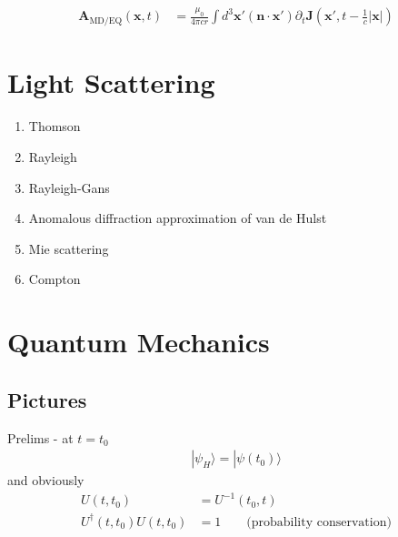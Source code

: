 \documentclass[../main.tex]{subfiles}
\begin{document}
\begin{align}
\mathbf{A}_\text{MD/EQ}(\mathbf{x},t)
&=\frac{\mu_0}{4\pi cr}\int d^3\mathbf{x}'(\mathbf{n}\cdot\mathbf{x}')\partial_t\mathbf{J}(\mathbf{x}',t-\frac{1}{c}|\mathbf{x}|)
\end{align}

\section{Light Scattering}

\begin{enumerate}
\item Thomson
\item Rayleigh 
\item Rayleigh-Gans
\item Anomalous diffraction approximation of van de Hulst
\item Mie scattering
\item Compton
\end{enumerate}

\section{Quantum Mechanics}
\subsection{Pictures}
Prelims - at $t=t_0$
\begin{align}
|\psi_H\rangle=|\psi(t_0)\rangle
\end{align}
and obviously
\begin{align}
U(t,t_0)&=U^{-1}(t_0,t)\\
U^\dagger(t,t_0)U(t,t_0)&=1\qquad\text{(probability conservation)}
\end{align}
\end{document}
